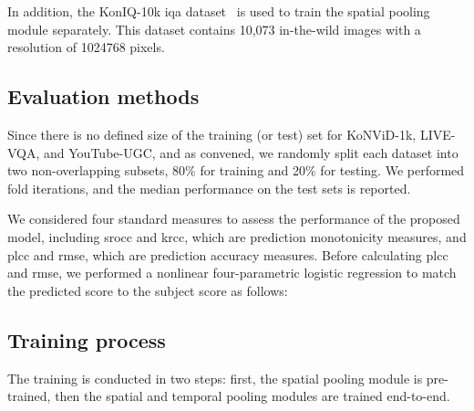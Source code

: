\documentclass[journal]{IEEEtran}
\begin{document}
In addition, the KonIQ-10k  \ac{iqa} dataset~\cite{hosu2020koniq} is used to train the spatial pooling module separately. This dataset contains 10,073 in-the-wild images with a  resolution of 1024768 pixels.
\subsection{Evaluation methods}
Since there is no defined size of the training (or test) set  for KoNViD-1k, LIVE-VQA, and YouTube-UGC, and as convened, we randomly split each dataset into two non-overlapping subsets, 80\% for training and 20\% for testing. We performed  fold iterations, and the median performance on the test sets is reported.

We considered four standard measures to assess the performance of the proposed model, including \ac{srocc} and \ac{krcc}, which are  prediction monotonicity measures, and \ac{plcc} and \ac{rmse}, which are  prediction accuracy measures. Before calculating \ac{plcc} and \ac{rmse}, we performed a nonlinear four-parametric logistic regression to match the predicted score to the subject score as follows:


\subsection{Training process}
The training is conducted in two steps: first, the spatial pooling module is pre-trained, then the spatial and temporal pooling modules are trained end-to-end.
\end{document}
